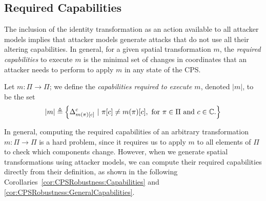 {{%

\subsection{Required Capabilities}
\label{sec:CPSRobustness:AttackerCapabilities}
The inclusion of the identity transformation as an action available to all attacker models implies that attacker models generate attacks that do not use all their altering {capabilities}. In general, for a given spatial transformation ${m}$, the \emph{required capabilities} to execute ${m}$ is the minimal set of changes in coordinates that an attacker needs to perform to apply ${m}$ in any state of the CPS. 

\begin{definition}
Let ${m}\colon \Pi\rightarrow \Pi$; we define the \emph{capabilities required to execute $m$}, denoted $|m|$, to be the set  
\begin{align}
  |m|\triangleq \left\{{\Delta}^c_{m(\pi)[c]}\ |\ \pi[c]\neq m(\pi)[c],\text{ for $\pi\in\Pi$ and $c\in \mathbb{C}$.}\right\}
\end{align}
\end{definition}

In general, computing the required capabilities of an arbitrary transformation $m\colon \Pi\rightarrow\Pi$ is a hard problem, since it requires us to apply $m$ to all elements of $\Pi$ to check which components change. However, when we generate spatial transformations using attacker models, we can compute their required capabilities directly from their definition, as shown in the following Corollaries~\ref{cor:CPSRobustness:Capabilities} and \ref{cor:CPSRobustness:GeneralCapabilities}. 

}}

